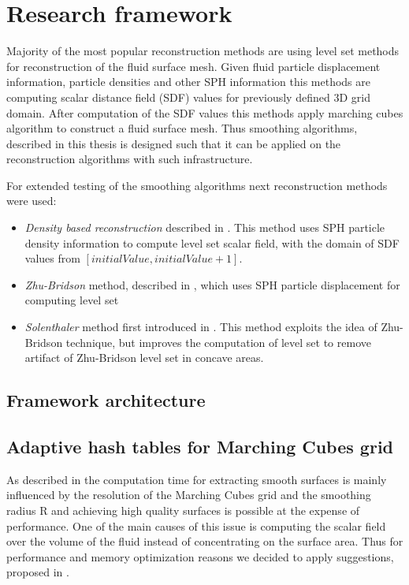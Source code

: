 \chapter{Research framework}
Majority of the most popular  reconstruction methods are using level set methods for reconstruction of the fluid surface mesh. Given fluid particle displacement information, particle densities and other SPH information this methods are computing scalar distance field (SDF) values for previously defined 3D grid domain. After computation of the SDF values this methods apply marching cubes algorithm to construct a fluid surface mesh.
Thus  smoothing algorithms, described in this thesis is designed such that it can be applied on the reconstruction algorithms with such infrastructure.


For extended testing of the smoothing algorithms next reconstruction methods were used:
\begin{itemize}
  \item \emph{Density based reconstruction} described in \cite{DencRec}. This method uses SPH particle density information to compute level set scalar field, with the domain of SDF values from $[initialValue, initialValue+1]$.
  \item \emph{Zhu-Bridson} method, described in \cite{ZhuBridson}, which uses SPH particle displacement for computing level set
  \item \emph{Solenthaler} method first introduced in \cite{Solenthaler}. This method exploits the idea of Zhu-Bridson technique, but improves the computation of level set to remove artifact of Zhu-Bridson level set in concave areas.
\end{itemize}



\section{Framework architecture}

\section{Adaptive hash tables for Marching Cubes grid}
As described in \cite{Akinchi} the computation time for extracting smooth surfaces is mainly influenced by
the resolution of the Marching Cubes grid and the smoothing radius R and achieving high quality surfaces is possible at the expense of performance. One of the main causes of this issue is computing the scalar field over the volume of the fluid instead of concentrating on the surface area. Thus for performance and memory optimization reasons we decided to apply suggestions, proposed in \cite{Akinchi}.

